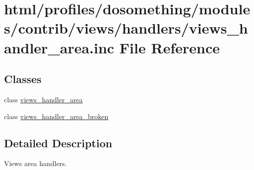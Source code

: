 \hypertarget{views__handler__area_8inc}{
\section{html/profiles/dosomething/modules/contrib/views/handlers/views\_\-handler\_\-area.inc File Reference}
\label{views__handler__area_8inc}
}
\subsection*{Classes}
\begin{DoxyCompactItemize}
\item 
class \hyperlink{classviews__handler__area}{views\_\-handler\_\-area}
\item 
class \hyperlink{classviews__handler__area__broken}{views\_\-handler\_\-area\_\-broken}
\end{DoxyCompactItemize}


\subsection{Detailed Description}
Views area handlers. 
